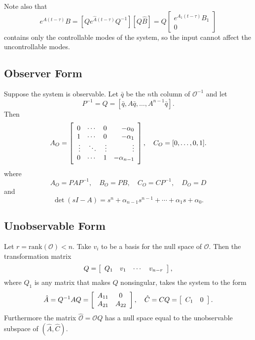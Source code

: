 \documentclass{report}
\begin{document}
Note also that
$$
e^{A(t - \tau)} B
= [ Q e^{\hat{A}(t - \tau)} Q^{-1} ]
  [ Q \hat{B} ]
= Q\left[\begin{array}{c}
     e^{A_1 (t - \tau)} B_1 \\
     0
   \end{array}\right]
$$
contains only the controllable modes of the system, so the input
cannot affect the uncontrollable modes.

\subsection{Observer Form}
Suppose the system is observable.
Let $\bar{q}$ be the $n$th column of $\mathcal{O}^{-1}$ and let
$$
P^{-1} = Q = [\bar{q}, A \bar{q}, \dots, A^{n-1} \bar{q}].
$$
Then
$$
A_O =
\left[\begin{array}{r r r r}
  0      & \cdots & 0      & -\alpha_0 \\
  1      & \cdots & 0      & -\alpha_1 \\
  \vdots & \ddots & \vdots & \vdots    \\
  0      & \cdots & 1      & -\alpha_{n-1}
\end{array}\right], \quad
C_O = [0, \dots, 0, 1].
$$
where
$$
A_O = P A P^{-1}, \quad
B_O = P B, \quad
C_O = C P^{-1}, \quad
D_O = D
$$
and
$$
\det (sI - A) = s^n + \alpha_{n-1} s^{n-1} + \cdots + \alpha_1 s + \alpha_0.
$$

\subsection{Unobservable Form}
Let $r = \mathrm{rank}(\mathcal{O}) < n$. Take
$v_i$ to be a basis for the null space of $\mathcal{O}$. Then the
transformation matrix
$$
Q =
\left[\begin{array}{c c c c }
  Q_1 & v_1 & \cdots & v_{n-r}
\end{array}\right],
$$
where $Q_1$ is any matrix that makes $Q$ nonsingular, takes the system
to the form
$$
\hat{A} = Q^{-1} A Q =
\left[\begin{array}{c c}
  A_{11} & 0      \\
  A_{21} & A_{22}
\end{array}\right], \quad
\hat{C} = C Q =
\left[\begin{array}{c c}
  C_1 & 0
\end{array}\right].
$$
Furthermore the matrix $\hat{\mathcal{O}} = \mathcal{O} Q$ has a null
space equal to the unobservable subspace of $(\hat{A}, \hat{C})$.
\end{document}
